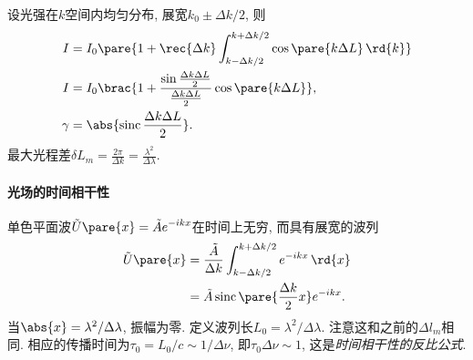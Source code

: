 \documentclass{ctexart}
\DeclareMathOperator{\sinc}{sinc}
\begin{document}
设光强在$k$空间内均匀分布, 展宽$k_0 \pm \Delta k / 2$, 则
\begin{align*}
    I &= I_0 \pare{1 + \rec{\Delta k} \int_{k-\Delta k/2}^{k+\Delta k/2} \cos \pare{k\Delta L}\,\rd{k}}\\
    I &= I_0 \brac{1 + \frac{\sin \frac{\Delta k \Delta L}{2}}{\frac{\Delta k \Delta L}{2}}\cos\pare{k\Delta L}},\\
    \gamma &= \abs{\sinc \frac{\Delta k\Delta L}{2}}.
\end{align*}
最大光程差$\displaystyle \delta L_m = \frac{2\pi}{\Delta k} = \frac{\lambda^2}{\Delta \lambda}$.


\paragraph{光场的时间相干性} %
\label{par:光场的时间相干性}

单色平面波$\displaystyle \tilde{U}\pare{x} = \tilde{A} e^{-ikx}$在时间上无穷, 而具有展宽的波列
\begin{align*}
    \tilde{U}\pare{x} &= \frac{\tilde{A}}{\Delta k} \int_{k-\Delta k/2}^{k+\Delta k/2} e^{-ikx}\,\rd{x} \\
    &= \tilde{A} \sinc \pare{\frac{\Delta k}{2}x}e^{-ikx}. 
\end{align*}
当$\abs{x} = \lambda^2/\Delta\lambda$, 振幅为零. 定义波列长$L_0 = \lambda^2/\Delta \lambda$. 注意这和之前的$\Delta l_m$相同. 相应的传播时间为$\tau_0 = L_0/c \sim 1/\Delta \nu$, 即$\tau_0 \Delta \nu \sim 1$, 这是\emph{时间相干性的反比公式}.

\end{document}
